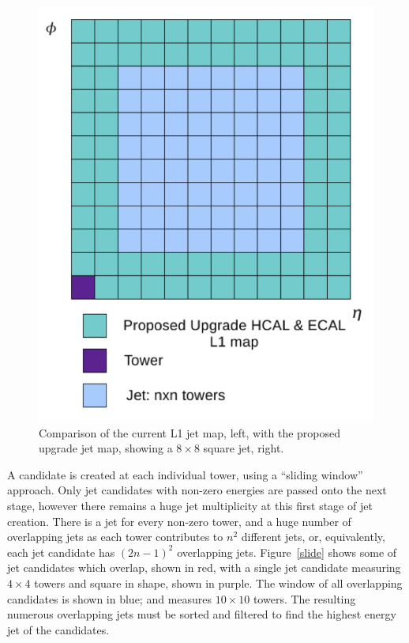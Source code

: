 \begin{figure}[ht]
\begin{center}
  \includegraphics[scale=0.37]{Figures/l1jets/UpgradeJet.jpg} 
\caption{Comparison of the current \ac{L1} jet map, left, with the proposed upgrade jet map, showing a $8\times8$ square jet, right.}
\label{fig:jetcartoon}
\end{center}
\end{figure}


A candidate is created at each individual tower, using a ``sliding window'' approach. 
Only jet candidates with non-zero energies are passed onto the next stage, 
however there remains a huge jet multiplicity at this first stage of jet creation. 
There is a jet for every non-zero tower, and a huge number of overlapping jets as each tower contributes to $n^{2}$ different jets, or, equivalently, each jet candidate has $(2n - 1)^{2}$ overlapping jets.
Figure~\ref{slide} shows some of jet candidates which overlap, shown in red, with a single jet candidate measuring $4\times4$ towers and square in shape, shown in purple.
The window of all overlapping candidates is shown in blue; and measures $10\times10$ towers.
The resulting numerous overlapping jets must be sorted and filtered to find the highest energy jet of the candidates.

